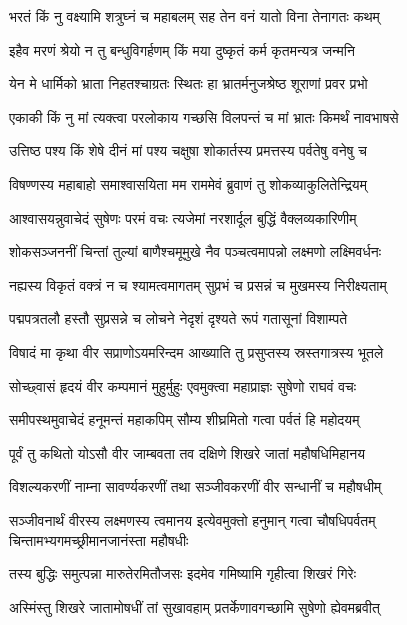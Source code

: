 \twolineshloka
{भरतं किं नु वक्ष्यामि शत्रुघ्नं च महाबलम्}
{सह तेन वनं यातो विना तेनागतः कथम्} %

\twolineshloka
{इहैव मरणं श्रेयो न तु बन्धुविगर्हणम्}
{किं मया दुष्कृतं कर्म कृतमन्यत्र जन्मनि} %

\twolineshloka
{येन मे धार्मिको भ्राता निहतश्चाग्रतः स्थितः}
{हा भ्रातर्मनुजश्रेष्ठ शूराणां प्रवर प्रभो} %

\twolineshloka
{एकाकी किं नु मां त्यक्त्वा परलोकाय गच्छसि}
{विलपन्तं च मां भ्रातः किमर्थं नावभाषसे} %

\twolineshloka
{उत्तिष्ठ पश्य किं शेषे दीनं मां पश्य चक्षुषा}
{शोकार्तस्य प्रमत्तस्य पर्वतेषु वनेषु च} %

\twolineshloka
{विषण्णस्य महाबाहो समाश्वासयिता मम}
{राममेवं ब्रुवाणं तु शोकव्याकुलितेन्द्रियम्} %

\twolineshloka
{आश्वासयन्नुवाचेदं सुषेणः परमं वचः}
{त्यजेमां नरशार्दूल बुद्धिं वैक्लव्यकारिणीम्} %

\twolineshloka
{शोकसञ्जननीं चिन्तां तुल्यां बाणैश्चमूमुखे}
{नैव पञ्चत्वमापन्नो लक्ष्मणो लक्ष्मिवर्धनः} %

\twolineshloka
{नह्यस्य विकृतं वक्त्रं न च श्यामत्वमागतम्}
{सुप्रभं च प्रसन्नं च मुखमस्य निरीक्ष्यताम्} %

\twolineshloka
{पद्मपत्रतलौ हस्तौ सुप्रसन्ने च लोचने}
{नेदृशं दृश्यते रूपं गतासूनां विशाम्पते} %

\twolineshloka
{विषादं मा कृथा वीर सप्राणोऽयमरिन्दम}
{आख्याति तु प्रसुप्तस्य स्रस्तगात्रस्य भूतले} %

\twolineshloka
{सोच्छ्वासं हृदयं वीर कम्पमानं मुहुर्मुहुः}
{एवमुक्त्वा महाप्राज्ञः सुषेणो राघवं वचः} %

\twolineshloka
{समीपस्थमुवाचेदं हनूमन्तं महाकपिम्}
{सौम्य शीघ्रमितो गत्वा पर्वतं हि महोदयम्} %

\twolineshloka
{पूर्वं तु कथितो योऽसौ वीर जाम्बवता तव}
{दक्षिणे शिखरे जातां महौषधिमिहानय} %

\twolineshloka
{विशल्यकरणीं नाम्ना सावर्ण्यकरणीं तथा}
{सञ्जीवकरणीं वीर सन्धानीं च महौषधीम्} %

\threelineshloka
{सञ्जीवनार्थं वीरस्य लक्ष्मणस्य त्वमानय}
{इत्येवमुक्तो हनुमान् गत्वा चौषधिपर्वतम्}
{चिन्तामभ्यगमच्छ्रीमानजानंस्ता महौषधीः} %

\twolineshloka
{तस्य बुद्धिः समुत्पन्ना मारुतेरमितौजसः}
{इदमेव गमिष्यामि गृहीत्वा शिखरं गिरेः} %

\twolineshloka
{अस्मिंस्तु शिखरे जातामोषधीं तां सुखावहाम्}
{प्रतर्केणावगच्छामि सुषेणो ह्येवमब्रवीत्} %

